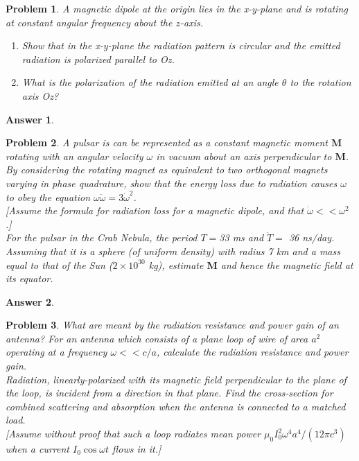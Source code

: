 \documentclass[a4paper]{article}
\newtheorem{ans}{Answer}[section]
\theoremstyle{new}
\newtheorem{qns}{Problem}[section]
\begin{document}
\newpage
\begin{qns}
A magnetic dipole at the origin lies in the x-y-plane and is rotating at constant angular frequency about the $z$-axis.
\begin{enumerate}[label=(\alph*)]
\item Show that in the x-y-plane the radiation pattern is circular and the emitted radiation is polarized parallel to Oz.
\item What is the polarization of the radiation emitted at an angle $\theta$ to the rotation axis Oz?
\end{enumerate}
\end{qns}
\begin{ans}

\end{ans}
\newpage
\begin{qns}
A pulsar is can be represented as a constant magnetic moment $\mathbf{M}$ rotating with
an angular velocity $\omega$ in vacuum about an axis perpendicular to $\mathbf{M}$. By considering the rotating magnet as equivalent to two orthogonal magnets varying in phase quadrature, show that the energy loss due to radiation causes $\omega$ to obey the equation $\omega\ddot{\omega}=3\dot{\omega}^2$.\\[5pt]
[Assume the formula for radiation loss for a magnetic dipole, and that $\dot{\omega}<<\omega^2$.]\\[5pt]
For the pulsar in the Crab Nebula, the period $T = $33 ms and $\dot{T}=$ 36 ns/day. Assuming that it is a sphere (of uniform density) with radius 7 km and a mass equal to that of the Sun ($2\times 10^{30}$ kg), estimate $\mathbf{M}$ and hence the magnetic field at its equator.
\end{qns}
\begin{ans}

\end{ans}
\begin{qns}
What are meant by the radiation resistance and power gain of an antenna? For an antenna which consists of a plane loop of wire of area $a^2$ operating at a frequency $\omega<<c/a$, calculate the radiation resistance and power gain.\\[5pt]
Radiation, linearly-polarized with its magnetic field perpendicular to the plane of the loop, is incident from a direction in that plane. Find the cross-section for combined scattering and absorption when the antenna is connected to a matched load.\\[5pt]
[Assume without proof that such a loop radiates mean power $\mu_0I_0^2\omega^4a^4/(12\pi c^3)$ when a current $I_0\cos\omega t$ flows in it.]
\end{qns}
\end{document}
